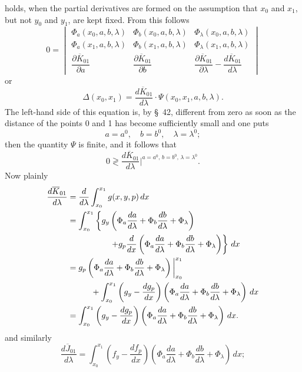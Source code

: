 \documentclass[11pt,a4paper,leqno]{article}
\begin{document}
holds, when the partial derivatives are formed on the assumption that $x_0$ and $x_1$, but not $y_0$ and $y_1$, are kept fixed. From this follows
\[
0=\begin{vmatrix}
\Phi_a(x_0,a,b,\lambda)&\Phi_b(x_0,a,b,\lambda)&\Phi_\lambda(x_0,a,b,\lambda)\\
\Phi_a(x_1,a,b,\lambda)&\Phi_b(x_1,a,b,\lambda)&\Phi_\lambda(x_1,a,b,\lambda)\\
\dfrac{\partial\overline{K}_{01}}{\partial a}&\dfrac{\partial\overline{K}_{01}}{\partial b}&\dfrac{\partial\overline{K}_{01}}{\partial\lambda}-\dfrac{d\overline{K}_{01}}{d\lambda}
\end{vmatrix}
\]
or
\[
\Delta(x_0,x_1)=\frac{d\overline{K}_{01}}{d\lambda}\cdot\Psi(x_0,x_1,a,b,\lambda).
\]
The left-hand side of this equation is, by \S~42, different from zero as soon as the distance of the points 0 and 1 has become sufficiently small and one puts
\begin{equation}\tag{7}
a=a^0,
\quad b=b^0,
\quad \lambda=\lambda^0;
\end{equation}
then the quantity $\Psi$ is finite, and it follows that
\begin{equation}\tag{8}
0\gtrless \frac{d\overline{K}_{01}}{d\lambda}\bigg|^{a=a^0,\,b=b^0,\,\lambda=\lambda^0}.
\end{equation}
Now plainly
\[
\begin{aligned}
\frac{d\overline{K}_{01}}{d\lambda}
&=\frac{d}{d\lambda}\int_{x_0}^{x_1}g(x,y,p)\,dx \\
&=\int_{x_0}^{x_1}\left\{g_y\left(\Phi_a\frac{da}{d\lambda}+\Phi_b\frac{db}{d\lambda}+\Phi_\lambda\right)\right.\\
&\hspace{18mm}\left.+g_p\frac{d}{dx}\left(\Phi_a\frac{da}{d\lambda}+\Phi_b\frac{db}{d\lambda}+\Phi_\lambda\right)\right\}\,dx \\
&=g_p\left(\Phi_a\frac{da}{d\lambda}+\Phi_b\frac{db}{d\lambda}+\Phi_\lambda\right)\bigg|_{x_0}^{x_1}\\
&\hspace{10mm}+\int_{x_0}^{x_1}\left(g_y-\frac{dg_p}{dx}\right)
\left(\Phi_a\frac{da}{d\lambda}+\Phi_b\frac{db}{d\lambda}+\Phi_\lambda\right)\,dx \\
&=\int_{x_0}^{x_1}\left(g_y-\frac{dg_p}{dx}\right)
\left(\Phi_a\frac{da}{d\lambda}+\Phi_b\frac{db}{d\lambda}+\Phi_\lambda\right)\,dx.
\end{aligned}
\]
and similarly
\[
\frac{d\overline{J}_{01}}{d\lambda}
=\int_{x_0}^{x_1}\left(f_y-\frac{df_p}{dx}\right)
\left(\Phi_a\frac{da}{d\lambda}+\Phi_b\frac{db}{d\lambda}+\Phi_\lambda\right)\,dx;
\]
\end{document}
